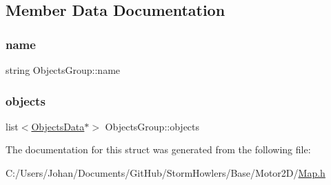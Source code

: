 \subsection{Member Data Documentation}
\mbox{\label{struct_objects_group_aa9da9d1a7a6bd76a43fc89e58fc1d9ef}} 
\subsubsection{\texorpdfstring{name}{name}}
{\footnotesize\ttfamily string Objects\+Group\+::name}

\mbox{\label{struct_objects_group_a6ec387c4f7bc0c04b5fed66a96cd8765}} 
\subsubsection{\texorpdfstring{objects}{objects}}
{\footnotesize\ttfamily list$<$\mbox{\hyperlink{struct_objects_data}{Objects\+Data}}$\ast$$>$ Objects\+Group\+::objects}



The documentation for this struct was generated from the following file\+:\begin{DoxyCompactItemize}
\item 
C\+:/\+Users/\+Johan/\+Documents/\+Git\+Hub/\+Storm\+Howlers/\+Base/\+Motor2\+D/\mbox{\hyperlink{_map_8h}{Map.\+h}}\end{DoxyCompactItemize}
